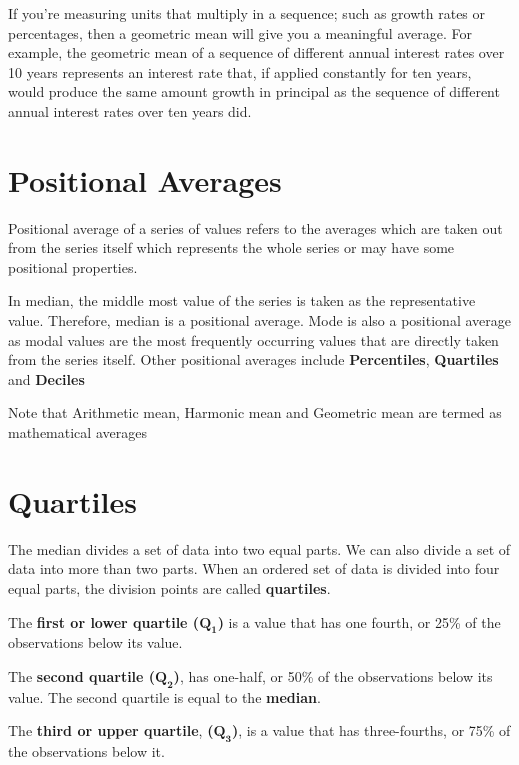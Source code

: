 \documentclass[
]{book}
\begin{document}
If you're measuring units that multiply in a sequence; such as growth
rates or percentages, then a geometric mean will give you a meaningful
average. For example, the geometric mean of a sequence of different
annual interest rates over 10 years represents an interest rate that, if
applied constantly for ten years, would produce the same amount growth
in principal as the sequence of different annual interest rates over ten
years did.

\hypertarget{positional-averages}{%
\section{Positional Averages}\label{positional-averages}}

Positional average of a series of values refers to the averages which
are taken out from the series itself which represents the whole series
or may have some positional properties.

In median, the middle most value of the series is taken as the
representative value. Therefore, median is a positional average. Mode is
also a positional average as modal values are the most frequently
occurring values that are directly taken from the series itself. Other
positional averages include \textbf{Percentiles}, \textbf{Quartiles} and
\textbf{Deciles}

Note that Arithmetic mean, Harmonic mean and Geometric mean are termed
as mathematical averages

\hypertarget{quartile}{%
\section{Quartiles}\label{quartile}}

The median divides a set of data into two equal parts. We can also
divide a set of data into more than two parts. When an ordered set of
data is divided into four equal parts, the division points are called
\textbf{quartiles}.

The \textbf{first or lower quartile (}\(\mathbf{Q}_{\mathbf{1}}\)\textbf{)} is a
value that has one fourth, or 25\% of the observations below its value.

The \textbf{second quartile (}\(\mathbf{Q}_{\mathbf{2}}\)\textbf{)}, has one-half,
or 50\% of the observations below its value. The second quartile is equal
to the \textbf{median}.

The \textbf{third or upper quartile}, \textbf{(}\(\mathbf{Q}_{\mathbf{3}}\)\textbf{)}, is
a value that has three-fourths, or 75\% of the observations below it.
\end{document}
